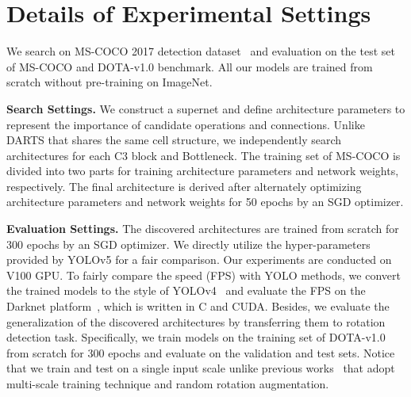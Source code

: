 \documentclass[letterpaper]{article} \usepackage{aaai22}  \usepackage{times}  \usepackage{helvet}  \usepackage{courier}  \usepackage[hyphens]{url}  \usepackage{graphicx} \urlstyle{rm} \def\UrlFont{\rm}  \usepackage{natbib}  \usepackage{caption} \DeclareCaptionStyle{ruled}{labelfont=normalfont,labelsep=colon,strut=off} \frenchspacing  \setlength{\pdfpagewidth}{8.5in}  \setlength{\pdfpageheight}{11in}
\begin{document}
\section{Details of Experimental Settings}
We search on MS-COCO 2017 detection dataset~\cite{coco} and evaluation on the test set of MS-COCO and DOTA-v1.0 benchmark. All our models are trained from scratch without pre-training on ImageNet.

\textbf{Search Settings.}
We construct a supernet and define architecture parameters to represent the importance of candidate operations and connections. Unlike DARTS that shares the same cell structure, we independently search architectures for each C3 block and Bottleneck. The training set of MS-COCO is divided into two parts for training architecture parameters and network weights, respectively. The final architecture is derived after alternately optimizing architecture parameters and network weights for 50 epochs by an SGD optimizer.


\textbf{Evaluation Settings.}
The discovered architectures are trained from scratch for 300 epochs by an SGD optimizer. We directly utilize the hyper-parameters provided by YOLOv5 for a fair comparison. 
Our experiments are conducted on V100 GPU.
To fairly compare the speed (FPS) with YOLO methods, we convert the trained models to the style of YOLOv4~\cite{bochkovskiy2020yolov4} and evaluate the FPS on the Darknet platform~\cite{darknet13}, which is written in C and CUDA.
Besides, we evaluate the generalization of the discovered architectures by transferring them to rotation detection task. Specifically, we train models on  the training set of DOTA-v1.0 from scratch for 300 epochs and evaluate on the validation and test sets. Notice that we train and test on a single input scale unlike previous works~\cite{redet,yang2021rethinking} that adopt multi-scale training technique and random rotation augmentation.
\end{document}
